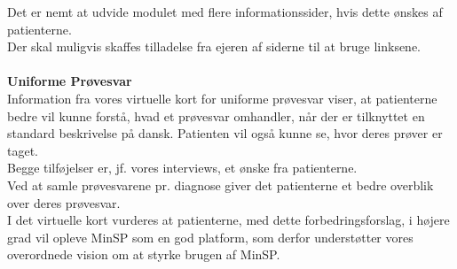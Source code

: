 Det er nemt at udvide modulet med flere informationssider, hvis dette ønskes af patienterne.\\
Der skal muligvis skaffes tilladelse fra ejeren af siderne til at bruge linksene.
\\\\
\textbf{Uniforme Prøvesvar}\\
Information fra vores virtuelle kort for uniforme prøvesvar viser, at patienterne bedre vil kunne forstå, hvad et prøvesvar omhandler, når der er tilknyttet en standard beskrivelse på dansk. Patienten vil også kunne se, hvor deres prøver er taget.\\
Begge tilføjelser er, jf. vores interviews, et ønske fra patienterne.\\
Ved at samle prøvesvarene pr. diagnose giver det patienterne et bedre overblik over deres prøvesvar.\\
I det virtuelle kort vurderes at patienterne, med dette forbedringsforslag, i højere grad vil opleve MinSP som en god platform, som derfor understøtter vores overordnede vision om at styrke brugen af MinSP. 
